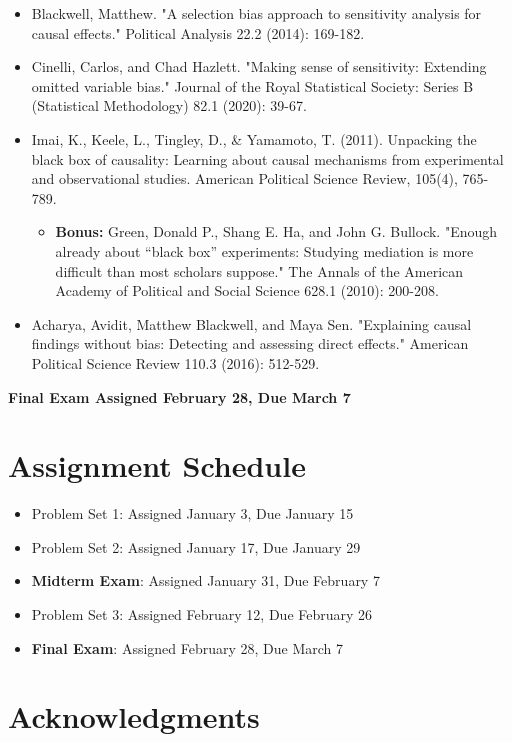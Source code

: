 \documentclass[11pt, article, oneside]{memoir}
\theoremstyle{Assumption}
\begin{document}
\begin{itemize}
\item Blackwell, Matthew. "A selection bias approach to sensitivity analysis for causal effects." Political Analysis 22.2 (2014): 169-182.
\item Cinelli, Carlos, and Chad Hazlett. "Making sense of sensitivity: Extending omitted variable bias." Journal of the Royal Statistical Society: Series B (Statistical Methodology) 82.1 (2020): 39-67.
\item Imai, K., Keele, L., Tingley, D., \& Yamamoto, T. (2011). Unpacking the black box of causality: Learning about causal mechanisms from experimental and observational studies. American Political Science Review, 105(4), 765-789.
\begin{itemize}
\item \textbf{Bonus:} Green, Donald P., Shang E. Ha, and John G. Bullock. "Enough already about “black box” experiments: Studying mediation is more difficult than most scholars suppose." The Annals of the American Academy of Political and Social Science 628.1 (2010): 200-208.
\end{itemize}
\item Acharya, Avidit, Matthew Blackwell, and Maya Sen. "Explaining causal findings without bias: Detecting and assessing direct effects." American Political Science Review 110.3 (2016): 512-529.
\end{itemize}


\textbf{Final Exam Assigned February 28, Due March 7}

\section*{Assignment Schedule}

\begin{itemize}
\item Problem Set 1: Assigned January 3, Due January 15
\item Problem Set 2: Assigned January 17, Due January 29
\item \textbf{Midterm Exam}: Assigned January 31, Due February 7
\item Problem Set 3: Assigned February 12, Due February 26
\item \textbf{Final Exam}: Assigned February 28, Due March 7 
\end{itemize}

\section*{Acknowledgments}
\end{document}
